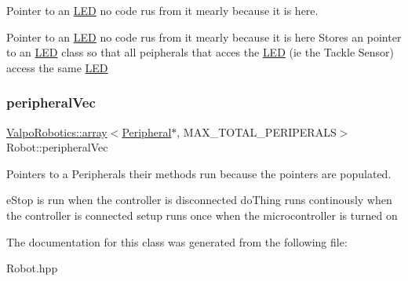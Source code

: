 Pointer to an \mbox{\hyperlink{class_l_e_d}{L\+ED}} no code rus from it mearly because it is here. 

Pointer to an \mbox{\hyperlink{class_l_e_d}{L\+ED}} no code rus from it mearly because it is here Stores an pointer to an \mbox{\hyperlink{class_l_e_d}{L\+ED}} class so that all peipherals that acces the \mbox{\hyperlink{class_l_e_d}{L\+ED}} (ie the Tackle Sensor) access the same \mbox{\hyperlink{class_l_e_d}{L\+ED}} \mbox{\label{class_robot_a8db438771a3e7dc9d2cf5dd2e1d25f74}} 
\subsubsection{\texorpdfstring{peripheral\+Vec}{peripheralVec}}
{\footnotesize\ttfamily \mbox{\hyperlink{class_valpo_robotics_1_1array}{Valpo\+Robotics\+::array}}$<$\mbox{\hyperlink{class_peripheral}{Peripheral}}$\ast$, M\+A\+X\+\_\+\+T\+O\+T\+A\+L\+\_\+\+P\+E\+R\+I\+P\+E\+R\+A\+LS$>$ Robot\+::peripheral\+Vec\hspace{0.3cm}{\ttfamily [protected]}}



Pointers to a Peripherals their methods run because the pointers are populated. 

e\+Stop is run when the controller is disconnected do\+Thing runs continously when the controller is connected setup runs once when the microcontroller is turned on 

The documentation for this class was generated from the following file\+:\begin{DoxyCompactItemize}
\item 
Robot.\+hpp\end{DoxyCompactItemize}
